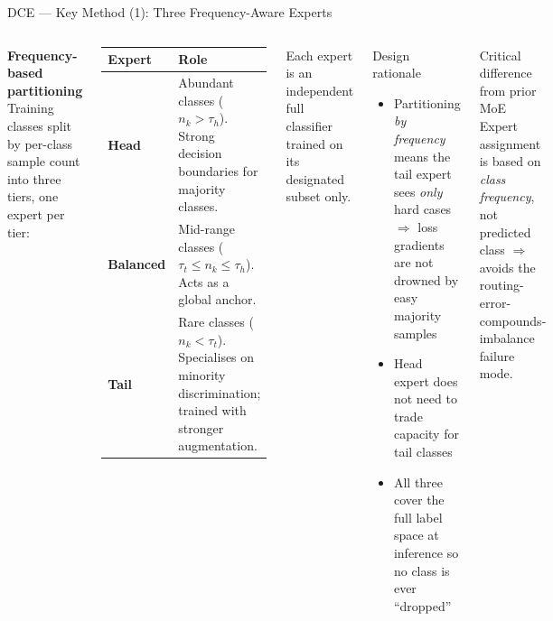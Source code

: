 \documentclass[aspectratio=169,10pt]{beamer}
\begin{document}
\begin{frame}{DCE --- Key Method (1): Three Frequency-Aware Experts}
  \begin{columns}[T]
      \textbf{Frequency-based partitioning}\\[4pt]
      Training classes split by per-class sample count
      into three tiers, one expert per tier:
      \vspace{6pt}
      \begin{center}
      \footnotesize
      \renewcommand{\arraystretch}{1.3}
      \begin{tabular}{>{\bfseries}lp{5.5cm}}
        \toprule
        Expert & Role \\
        \midrule
        Head & Abundant classes ($n_k > \tau_h$).
               Strong decision boundaries for majority classes. \\
        Balanced & Mid-range classes ($\tau_t \le n_k \le \tau_h$).
                   Acts as a global anchor. \\
        Tail & Rare classes ($n_k < \tau_t$).
               Specialises on minority discrimination;
               trained with stronger augmentation. \\
        \bottomrule
      \end{tabular}
      \end{center}
      \vspace{6pt}
      Each expert is an independent full classifier trained on its
      designated subset only.
    \begin{block}{Design rationale}
      \begin{itemize}
        \item Partitioning \emph{by frequency} means the tail expert sees
              \emph{only} hard cases $\Rightarrow$ loss gradients are not
              drowned by easy majority samples
        \item Head expert does not need to trade capacity for tail classes
        \item All three cover the full label space at inference so no class
              is ever ``dropped''
      \end{itemize}
    \end{block}
    \vspace{4pt}
    \begin{alertblock}{Critical difference from prior MoE}
      Expert assignment is based on \emph{class frequency},
      not predicted class $\Rightarrow$
      avoids the routing-error-compounds-imbalance failure mode.
    \end{alertblock}
  \end{columns}
\end{frame}
\end{document}
